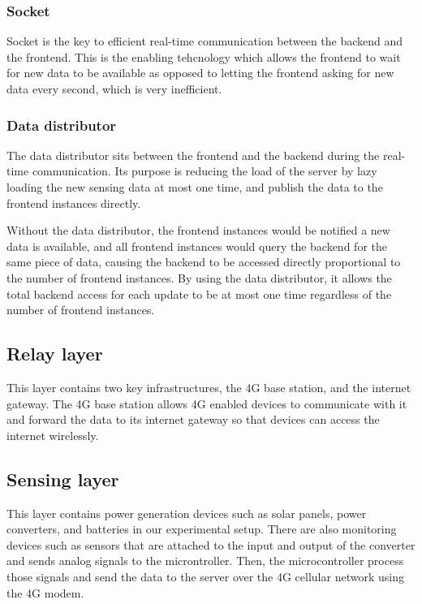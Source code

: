 \documentclass[../thesis.tex]{subfiles}
\begin{document}
\subsubsection{Socket}

Socket is the key to efficient real-time communication between the backend and the frontend. This is the enabling tehcnology which allows the frontend to wait for new data to be available as opposed to letting the frontend asking for new data every second, which is very inefficient. 

\subsubsection{Data distributor}

The data distributor sits between the frontend and the backend during the real-time communication. Its purpose is reducing the load of the server by lazy loading the new sensing data at most one time, and publish the data to the frontend instances directly. 

Without the data distributor, the frontend instances would be notified a new data is available, and all frontend instances would query the backend for the same piece of data, causing the backend to be accessed directly proportional to the number of frontend instances. By using the data distributor, it allows the total backend access for each update to be at most one time regardless of the number of frontend instances. 

\subsection{Relay layer}

This layer contains two key infrastructures, the 4G base station, and the internet gateway. The 4G base station allows 4G enabled devices to communicate with it and forward the data to its internet gateway so that devices can access the internet wirelessly. 

\subsection{Sensing layer}

This layer contains power generation devices such as solar panels, power converters, and batteries in our experimental setup. There are also monitoring devices such as sensors that are attached to the input and output of the converter and sends analog signals to the microntroller. Then, the microcontroller process those signals and send the data to the server over the 4G cellular network using the 4G modem. 
\end{document}
